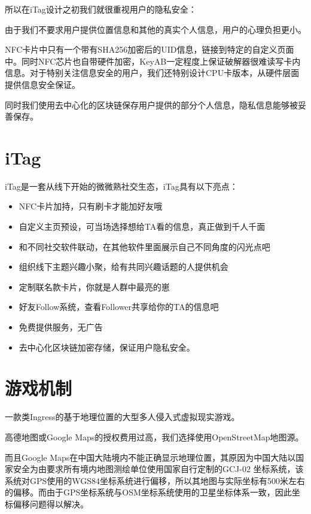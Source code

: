 \documentclass[UTF8]{ctexart}
\begin{document}
所以在iTag设计之初我们就很重视用户的隐私安全：

由于我们不要求用户提供位置信息和其他的真实个人信息，用户的心理负担更小。

NFC卡片中只有一个带有SHA256加密后的UID信息，链接到特定的自定义页面中。同时NFC芯片也自带硬件加密，KeyAB一定程度上保证破解器很难读写卡内信息。对于特别关注信息安全的用户，我们还特别设计CPU卡版本，从硬件层面提供信息安全保证。

同时我们使用去中心化的区块链保存用户提供的部分个人信息，隐私信息能够被妥善保存。

\section{iTag}
iTag是一套从线下开始的微微熟社交生态，iTag具有以下亮点：

\begin{itemize}
    \item NFC卡片加持，只有刷卡才能加好友哦
    \item 自定义主页预设，可当场选择想给TA看的信息，真正做到千人千面
    \item 和不同社交软件联动，在其他软件里面展示自己不同角度的闪光点吧
    \item 组织线下主题兴趣小聚，给有共同兴趣话题的人提供机会
    \item 定制联名款卡片，你就是人群中最亮的崽
    \item 好友Follow系统，查看Follower共享给你的TA的信息吧~
    \item 免费提供服务，无广告
    \item 去中心化区块链加密存储，保证用户隐私安全。
\end{itemize}

\section{游戏机制}

一款类Ingress的基于地理位置的大型多人侵入式虚拟现实游戏。

高德地图或Google Maps的授权费用过高，我们选择使用OpenStreetMap地图源。

而且Google Maps在中国大陆境内不能正确显示地理位置，其原因为中国大陆以国家安全为由要求所有境内地图测绘单位使用国家自行定制的GCJ-02 坐标系统，该系统对GPS使用的WGS84坐标系统进行偏移，所以其地图与实际坐标有500米左右的偏移。而由于GPS坐标系统与OSM坐标系统使用的卫星坐标体系一致，因此坐标偏移问题得以解决。
\end{document}
